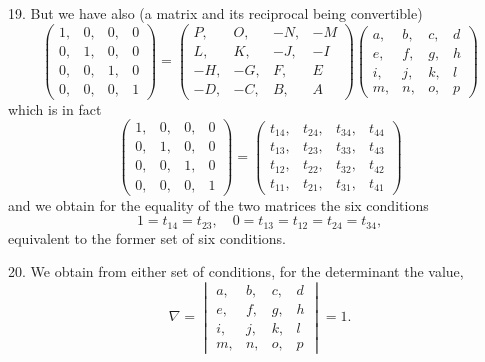 \documentclass[11pt,a4paper]{article}
\theoremstyle{plain}
\begin{document}
19. But we have also (a matrix and its reciprocal being convertible)
\[
\begin{pmatrix}
1, & 0, & 0, & 0 \\
0, & 1, & 0, & 0 \\
0, & 0, & 1, & 0 \\
0, & 0, & 0, & 1
\end{pmatrix}
=
\begin{pmatrix}
P, & O, & -N, & -M \\
L, & K, & -J, & -I \\
-H, & -G, & F, & E \\
-D, & -C, & B, & A
\end{pmatrix}
\begin{pmatrix}
a, & b, & c, & d \\
e, & f, & g, & h \\
i, & j, & k, & l \\
m, & n, & o, & p
\end{pmatrix}
\]
which is in fact
\[
\begin{pmatrix}
1, & 0, & 0, & 0 \\
0, & 1, & 0, & 0 \\
0, & 0, & 1, & 0 \\
0, & 0, & 0, & 1
\end{pmatrix}
=
\begin{pmatrix}
t_{14}, & t_{24}, & t_{34}, & t_{44} \\
t_{13}, & t_{23}, & t_{33}, & t_{43} \\
t_{12}, & t_{22}, & t_{32}, & t_{42} \\
t_{11}, & t_{21}, & t_{31}, & t_{41}
\end{pmatrix}
\]
and we obtain for the equality of the two matrices the six conditions
\[
1 = t_{14} = t_{23}, \quad 0 = t_{13} = t_{12} = t_{24} = t_{34},
\]
equivalent to the former set of six conditions.

20. We obtain from either set of conditions, for the determinant the value,
\[
\nabla =
\begin{vmatrix}
a, & b, & c, & d \\
e, & f, & g, & h \\
i, & j, & k, & l \\
m, & n, & o, & p
\end{vmatrix}
= 1.
\]
\end{document}
